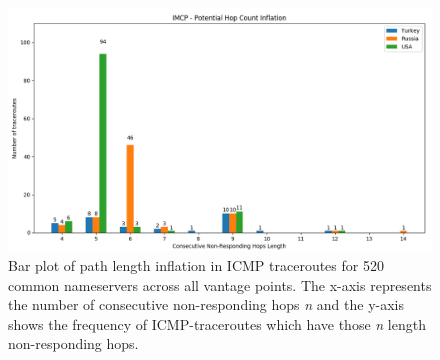\begin{figure}[!h]
\centering
  \includegraphics[width=\linewidth]{figures/missing-hops-bar.png}
  \caption{Bar plot of path length inflation in ICMP traceroutes for 520 common nameservers across all vantage points. The x-axis represents the number of consecutive non-responding hops \textit{n} and the y-axis shows the frequency of ICMP-traceroutes which have those \textit{n} length non-responding hops.}
  \label{fig:inflated-path-bar}
\end{figure}
